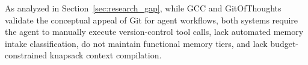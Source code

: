 As analyzed in Section~\ref{sec:research_gap}, while GCC and GitOfThoughts validate the conceptual appeal of Git for agent workflows, both systems require the agent to manually execute version-control tool calls, lack automated memory intake classification, do not maintain functional memory tiers, and lack budget-constrained knapsack context compilation.

